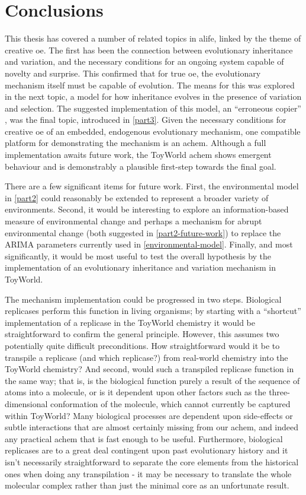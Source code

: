 \chapter{Conclusions}\label{thesis-conclusions}

This thesis has covered a number of related topics in \gls{alife}, linked by the theme of creative \gls{oe}. The first has been the connection between evolutionary inheritance and variation, and the necessary conditions for an ongoing system capable of novelty and surprise. This confirmed that for true \gls{oe}, the evolutionary mechanism itself must be capable of evolution. The means for this was explored in the next topic, a model for how inheritance evolves in the presence of variation and selection. The suggested implementation of this model, an ``erroneous copier'' \parencite[p.16]{Zachar2010}, was the final topic, introduced in \cref{part3}. Given the necessary conditions for creative \gls{oe} of an embedded, endogenous evolutionary mechanism, one compatible platform for demonstrating the mechanism is an \gls{achem}. Although a full implementation awaits future work, the ToyWorld \gls{achem} shows emergent behaviour and is demonstrably a plausible first-step towards the final goal.

There are a few significant items for future work. First, the environmental model in \cref{part2} could reasonably be extended to represent a broader variety of environments. Second, it would be interesting to explore an information-based measure of environmental change and perhaps a mechanism for abrupt environmental change (both suggested in \cref{part2-future-work}) to replace the ARIMA parameters currently used in \cref{environmental-model}. Finally, and most significantly, it would be most useful to test the overall hypothesis by the implementation of an evolutionary inheritance and variation mechanism in ToyWorld.

The mechanism implementation could be progressed in two steps. Biological replicases perform this function in living organisms; by starting with a ``shortcut'' implementation of a replicase in the ToyWorld chemistry it would be straightforward to confirm the general principle. However, this assumes two potentially quite difficult preconditions. How straightforward would it be to transpile a replicase (and which replicase?) from real-world chemistry into the ToyWorld chemistry? And second, would such a transpiled replicase function in the same way; that is, is the biological function purely a result of the sequence of atoms into a molecule, or is it dependent upon other factors such as the three-dimensional conformation of the molecule, which cannot currently be captured within ToyWorld? Many biological processes are dependent upon side-effects or subtle interactions that are almost certainly missing from our \gls{achem}, and indeed any practical \gls{achem} that is fast enough to be useful. Furthermore, biological replicases are to a great deal contingent upon past evolutionary history and it isn't necessarily straightforward to separate the core elements from the historical ones when doing any transpilation - it may be necessary to translate the whole molecular complex rather than just the minimal core as an unfortunate result.

